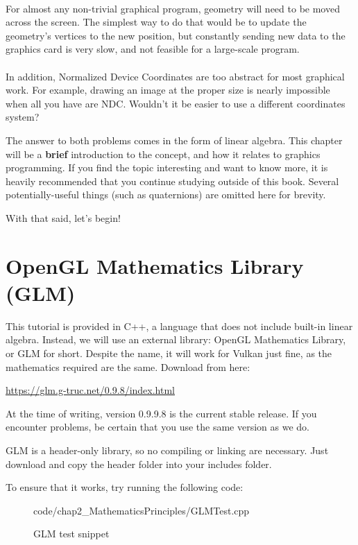 \paragraph{}
For almost any non-trivial graphical program, geometry will need to be moved across the screen. The simplest way to do that would be to update the geometry's vertices to the new position, but constantly sending new data to the graphics card is very slow, and not feasible for a large-scale program.

\paragraph{}
In addition, Normalized Device Coordinates are too abstract for most graphical work. For example, drawing an image at the proper size is nearly impossible when all you have are NDC. Wouldn't it be easier to use a different coordinates system?

\par
The answer to both problems comes in the form of linear algebra. This chapter will be a \textbf{brief} introduction to the concept, and how it relates to graphics programming. If you find the topic interesting and want to know more, it is heavily recommended that you continue studying outside of this book. Several potentially-useful things (such as quaternions) are omitted here for brevity.

\par
With that said, let's begin!

\section{OpenGL Mathematics Library (GLM)}
\par
This tutorial is provided in C++, a language that does not include built-in linear algebra. Instead, we will use an external library: OpenGL Mathematics Library, or GLM for short. Despite the name, it will work for Vulkan just fine, as the mathematics required are the same. Download from here:

\par
\href{https://glm.g-truc.net/0.9.8/index.html}{https://glm.g-truc.net/0.9.8/index.html}

\par
At the time of writing, version 0.9.9.8 is the current stable release. If you encounter problems, be certain that you use the same version as we do.

\par
GLM is a header-only library, so no compiling or linking are necessary. Just download and copy the header folder into your includes folder.

\par
To ensure that it works, try running the following code:

\begin{figure}[h]
    \centering
    \colorbox{backgroundcolor}{
        \parbox{0.9\textwidth}{
            
            {code/chap2_MathematicsPrinciples/GLMTest.cpp}
        }
    }
    \caption{GLM test snippet}
    \label{fig:glm_snippet}
\end{figure}